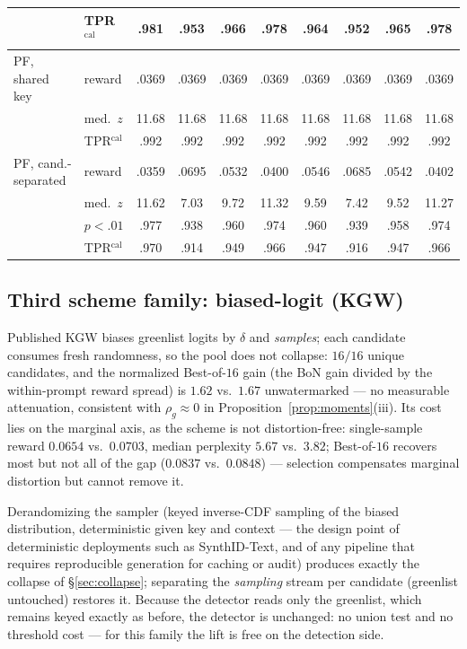 \documentclass{article} %
\begin{document}
\begin{table}[h]
\begin{center}
\begin{tabular}{llcccccccc}
 & TPR$^{\mathrm{cal}}$ & .981 & .953 & .966 & .978 & .964 & .952 & .965 & .978 \\
\midrule
PF, shared key & reward & .0369 & .0369 & .0369 & .0369 & .0369 & .0369 & .0369 & .0369 \\
 & med.\ $z$ & 11.68 & 11.68 & 11.68 & 11.68 & 11.68 & 11.68 & 11.68 & 11.68 \\
 & TPR$^{\mathrm{cal}}$ & .992 & .992 & .992 & .992 & .992 & .992 & .992 & .992 \\
\midrule
PF, cand.-separated & reward & .0359 & .0695 & .0532 & .0400 & .0546 & .0685 & .0542 & .0402 \\
 & med.\ $z$ & 11.62 & 7.03 & 9.72 & 11.32 & 9.59 & 7.42 & 9.52 & 11.27 \\
 & $p{<}.01$ & .977 & .938 & .960 & .974 & .960 & .939 & .958 & .974 \\
 & TPR$^{\mathrm{cal}}$ & .970 & .914 & .949 & .966 & .947 & .916 & .947 & .966 \\
\bottomrule
\end{tabular}
\end{center}
\end{table}

\subsection{Third scheme family: biased-logit (KGW)}\label{app:kgw}
Published KGW biases greenlist logits by $\delta$ and \emph{samples}; each
candidate consumes fresh randomness, so the pool does not collapse: $16/16$
unique candidates, and the normalized Best-of-$16$ gain (the BoN gain divided
by the within-prompt reward spread) is $1.62$ vs.\ $1.67$ unwatermarked ---
no measurable attenuation, consistent with $\rho_g\approx0$ in
Proposition~\ref{prop:moments}(iii). Its cost lies on the marginal axis, as
the scheme is not distortion-free: single-sample reward $0.0654$ vs.\
$0.0703$, median perplexity $5.67$ vs.\ $3.82$; Best-of-$16$ recovers most
but not all of the gap ($0.0837$ vs.\ $0.0848$) --- selection compensates
marginal distortion \citep{verma2025watermarking} but cannot remove it.

Derandomizing the sampler (keyed inverse-CDF sampling of the biased
distribution, deterministic given key and context --- the design point of
deterministic deployments such as SynthID-Text, and of any pipeline that
requires reproducible generation for caching or audit) produces exactly the
collapse of \S\ref{sec:collapse}; separating the \emph{sampling} stream
per candidate (greenlist untouched) restores it. Because the detector reads
only the greenlist, which remains keyed exactly as before, the detector is
unchanged: no union test and no threshold cost --- for this family the lift
is free on the detection side.
\end{document}
